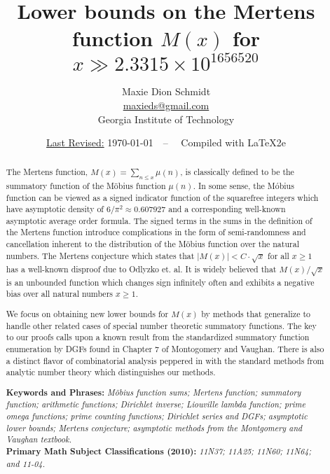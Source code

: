 \documentclass[11pt,reqno,a4letter]{article}
\title{
       \LARGE{
       Lower bounds on the Mertens function $M(x)$ for $x \gg 2.3315 \times 10^{1656520}$ 
       } 
}
\author{{\large Maxie Dion Schmidt} \\ 
        {\normalsize \href{mailto:maxieds@gmail.com}{maxieds@gmail.com}} \\[0.1cm] 
        {\small Georgia Institute of Technology} 
}
\date{\small\underline{Last Revised:} \today\ \ -- \ \ Compiled with \LaTeX2e}
\numberwithin{figure}{section}
\numberwithin{table}{section}
\theoremstyle{plain}
\numberwithin{theorem}{section}
\theoremstyle{definition}
\begin{document}
 

\maketitle

\begin{abstract} 
The Mertens function, $M(x) = \sum_{n \leq x} \mu(n)$, is classically 
defined to be the summatory function of the M\"obius function 
$\mu(n)$. In some sense, the M\'obius function can be viewed as a 
signed indicator function of the squarefree integers which have 
asymptotic density of $6 / \pi^2 \approx 0.607927$ and a corresponding 
well-known asymptotic average order formula. The signed terms in the 
sums in the definition of the Mertens function introduce complications 
in the form of semi-randomness and cancellation inherent to the 
distribution of the M\"obius function over the natural numbers. The 
Mertens conjecture which states that $|M(x)| < C \cdot \sqrt{x}$ for all 
$x \geq 1$ has a well-known disproof due to Odlyzko et. al. 
It is widely believed that $M(x) / \sqrt{x}$ is an unbounded function 
which changes sign infinitely often and exhibits a negative bias 
over all natural numbers $x \geq 1$. 

We focus on obtaining new lower bounds 
for $M(x)$ by methods that generalize to handle other related cases of 
special number theoretic summatory functions. 
The key to our proofs calls upon a known result from the standardized 
summatory function enumeration by DGFs found in Chapter 7 of 
Montogomery and Vaughan. There is also a distinct flavor of combinatorial analysis 
peppered in with the standard methods from analytic number theory which distinguishes 
our methods. 

\bigskip %
\noindent
\textbf{Keywords and Phrases:} {\it M\"obius function sums; Mertens function; summatory function; 
                                    arithmetic functions; 
                                    Dirichlet inverse; Liouville lambda function; prime omega functions; 
                                    prime counting functions; Dirichlet series and DGFs; 
                                    asymptotic lower bounds; Mertens conjecture; 
                                    asymptotic methods from the Montgomery and Vaughan textbook. } \\ 
\textbf{Primary Math Subject Classifications (2010):} {\it 11N37; 11A25; 11N60; 11N64; and 11-04. } 
\end{abstract} 
\end{document}
